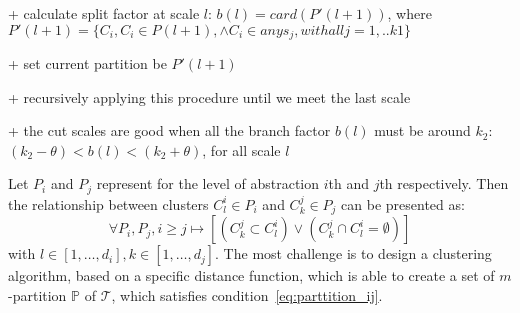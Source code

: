 + calculate split factor at scale $l$: $b(l) = card(P'(l+1))$, where $P'(l+1) = \{C_i, C_i \in P(l+1), \wedge C_i \in any s_j, with all j =1,..k1\}$

+ set current partition be $P'(l+1)$

+ recursively applying this procedure until we meet the last scale

+ the cut scales are good when all the branch factor $b(l)$ must be around $k_2$: $(k_2 - \theta) < b(l)< (k_2 + \theta)$, for all scale $l$

Let $P_i$ and $P_j$ represent for the level of abstraction $i$th and $j$th respectively. Then the relationship between clusters $C_{l}^{i} \in P_i$ and $C_{k}^{j} \in P_j$ can be presented as: 
\begin{equation}
\label{eq:parttition_ij}
	\forall  P_i, P_j, i \geq j \mapsto [(C_{k}^{j} \subset C_{l}^{i}) \vee (C_{k}^{j} \cap  C_{l}^{i} = \emptyset)]    
\end{equation}
with $l \in [1, \ldots, d_i],k \in [1, \ldots, d_j]$. The most challenge is to design a clustering algorithm, based on a specific distance function, which is able to create a set of $m$-partition $\mathbb{P}$ of $\mathcal{T}$, which satisfies condition~\ref{eq:parttition_ij}. 
